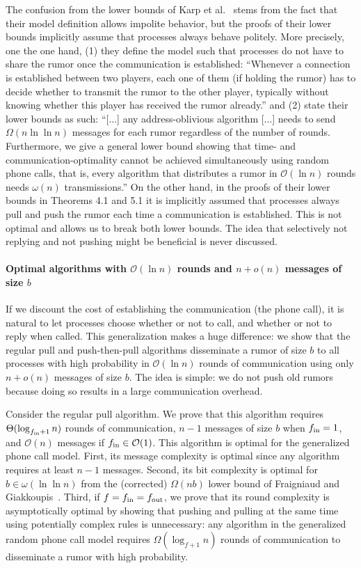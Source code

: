 The confusion from the lower bounds of Karp et al.~\cite{DBLP:conf/focs/KarpSSV00} stems from the fact that their model definition allows impolite behavior, but the proofs of their lower bounds implicitly assume that processes always behave politely. More precisely, one the one hand, (1) they define the model such that processes do not have to share the rumor once the communication is established: ``Whenever a connection is established between two players, each one of them (if holding the rumor) has to decide whether to transmit the rumor to the other player, typically without knowing whether this player has received the rumor already.'' and (2) state their lower bounds as such: ``[...] any address-oblivious algorithm [...] needs to send $\Omega(n \ln \ln n)$ messages for each rumor regardless of the number of rounds. Furthermore, we give a general lower bound showing that time- and communication-optimality cannot be achieved simultaneously using random phone calls, that is, every algorithm that distributes a rumor
in $\mathcal{O}(\ln n)$ rounds needs $\omega(n)$ transmissions.'' On the other hand, in the proofs of their lower bounds in Theorems 4.1 and 5.1 it is implicitly assumed that processes always pull and push the rumor each time a communication is established. This is not optimal and allows us to break both lower bounds. The idea that selectively not replying and not pushing might be beneficial is never discussed.

\paragraph{\textbf{Optimal algorithms with  $\mathcal{O}(\ln n)$ rounds and $n+o(n)$ messages of size $b$}}

If we discount the cost of establishing the communication (the phone call), it is natural to let processes choose whether or not to call, and whether or not to reply when called. This generalization makes a huge difference: we show that the regular pull and push-then-pull algorithms disseminate a rumor of size $b$ to all processes with high probability in $\mathcal{O}(\ln n)$ rounds of communication using only $n+o(n)$ messages of size $b$. The idea is simple: we do not push old rumors because doing so results in a large communication overhead. 

Consider the regular pull algorithm. We prove that this algorithm requires $\Theta(\log_{f_\text{in}+1} n)$ rounds of communication, $n-1$ messages of size $b$ when $f_\text{in}=1$, and $\mathcal{O}(n)$ messages if $f_\text{in} \in \mathcal{O}(1)$. This algorithm is optimal for the generalized phone call model. First, its message complexity is optimal since any algorithm requires at least $n-1$ messages. Second, its bit complexity is optimal for $b\in\omega(\ln \ln n)$ from the (corrected) $\Omega(nb)$ lower bound of Fraigniaud and Giakkoupis~\cite{DBLP:conf/spaa/FraigniaudG10}. 
Third, if $f=f_\text{in} = f_\text{out}$, we prove that its round complexity is asymptotically optimal by showing that pushing and pulling at the same time using potentially complex rules is unnecessary: any algorithm in the generalized random phone call model requires $\Omega(\log_{f+1} n)$ rounds of communication to disseminate a rumor with high probability.

